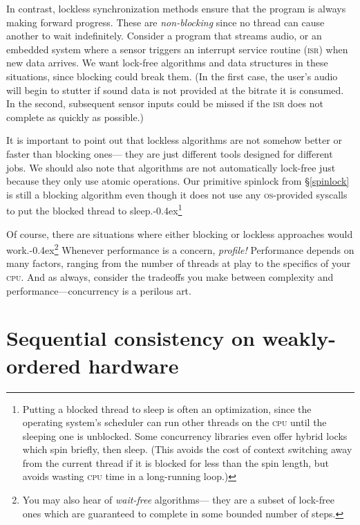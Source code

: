 \documentclass[fontsize=10pt, oneside]{scrartcl}
\newcommand{\punckern}{\kern-0.4ex}
\newcommand{\introduce}[1]{\textit{#1}}
\newcommand{\secref}[1]{\hyperref[#1]{\textsc{\S}\ref*{#1}}}
\begin{document}
In contrast, lockless synchronization methods ensure that the program is always making forward progress.
These are \introduce{non-blocking} since no thread can cause another to wait indefinitely.
Consider a program that streams audio,
or an embedded system where a sensor triggers an interrupt service routine \textsc{(isr)} when new data arrives.
We want lock-free algorithms and data structures in these situations,
since blocking could break them.
(In the first case, the user's audio will begin to stutter if sound data is not provided at the bitrate it is consumed.
In the second, subsequent sensor inputs could be missed if the \textsc{isr} does not complete as quickly as possible.)

\setcounter{footnote}{0}
It is important to point out that lockless algorithms are not somehow better or faster than blocking ones---
they are just different tools designed for different jobs.
We should also note that algorithms are not automatically lock-free just because they only use atomic operations.
Our primitive spinlock from \secref{spinlock} is still a blocking algorithm even though it does not use any \textsc{os}-provided syscalls to put the blocked thread to sleep.\punckern\footnote{Putting a blocked thread
to sleep is often an optimization,
since the operating system's scheduler can run other threads on the \textsc{cpu} until the sleeping one is unblocked.
Some concurrency libraries even offer hybrid locks which spin briefly, then sleep.
(This avoids the cost of context switching away from the current thread if it is blocked for less than the spin length,
but avoids wasting \textsc{cpu} time in a long-running loop.)}

Of course, there are situations where either blocking or lockless approaches would work.\punckern\footnote{%
You may also hear of \introduce{wait-free} algorithms---
they are a subset of lock-free ones which are guaranteed to complete in some bounded number of steps.}
Whenever performance is a concern, \emph{profile!}
Performance depends on many factors,
ranging from the number of threads at play to the specifics of your \textsc{cpu}.
And as always, consider the tradeoffs you make between complexity and performance---concurrency is a perilous art.

\section{Sequential consistency on weakly-ordered hardware}
\end{document}
